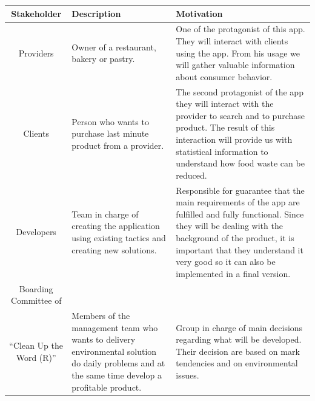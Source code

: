 \begin{table}[H]
    \begin{tabularx}{\textwidth}{cXX}
    \toprule
    Stakeholder & Description & Motivation  \\
    \midrule
    Providers & Owner of a restaurant, bakery or pastry. & One of the protagonist of this app. They will interact
    with clients using the app. From his usage we will gather valuable information about consumer behavior. \\
    Clients & Person who wants to purchase last minute product from a provider. & The second protagonist of the app
    they will interact with the provider to search and to purchase product. The result of this interaction will
    provide us with statistical information to understand how food waste can be reduced.  \\
    Developers & Team in charge of creating the application using existing tactics and creating new solutions.
    & Responsible for guarantee that the main requirements of the app are fulfilled and fully functional. 
    Since they will be dealing with the background of the product, it is important that they understand it very
    good so it can also be implemented in a final version.\\
    Boarding Committee of \\ ``Clean Up the Word (R)'' & Members of the management team who wants to delivery 
    environmental solution do daily problems and at the same time develop a profitable product.
    & Group in charge of main decisions regarding what will be developed. Their decision are based on mark tendencies
    and on environmental issues.  \\
    \bottomrule
    \end{tabularx}
\end{table}